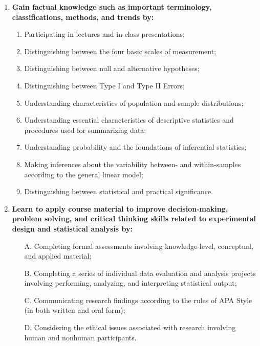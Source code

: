 \documentclass[
]{article}
\begin{document}
\begin{enumerate}
\item {\bf{Gain factual knowledge such as important terminology, classifications, methods, and trends by:}}

\begin{enumerate}[label=\Alph*.]
\itemsep2pt\parskip0pt
\item Participating in lectures and in-class presentations;
\item Distinguishing between the four basic scales of measurement;
\item Distinguishing between null and alternative hypotheses;
\item Distinguishing between Type I and Type II Errors;
\item Understanding characteristics of population and sample distributions;
\item Understanding essential characteristics of descriptive statistics and procedures used for summarizing data;
\item Understanding probability and the foundations of inferential statistics;
\item Making inferences about the variability between- and within-samples according to the general linear model;
\item Distinguishing between statistical and practical significance.
\end{enumerate}

\item {\bf{Learn to apply course material to improve decision-making, problem solving, and critical thinking skills related to experimental design and statistical analysis by:}}

\begin{enumerate}[label=\Alph*.]
\itemsep2pt\parskip0pt
\item[A.] Completing formal assessments involving knowledge-level, conceptual, and applied material;
\item[B.] Completing a series of individual data evaluation and analysis projects involving performing, analyzing, and interpreting statistical output;
\item[C.] Communicating research findings according to the rules of APA Style (in both written and oral form);
\item[D.] Considering the ethical issues associated with research involving human and nonhuman participants.
\end{enumerate}
\end{enumerate}
\end{document}
